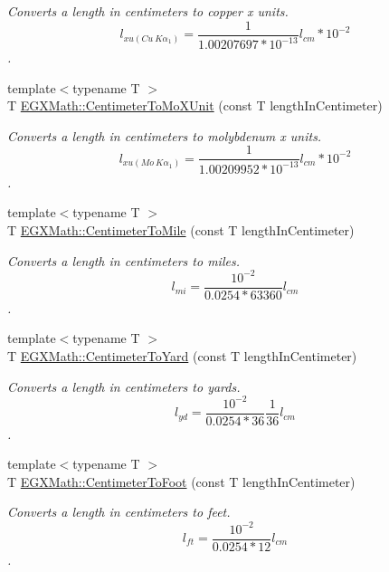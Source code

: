 \begin{DoxyCompactItemize}
\begin{DoxyCompactList}\small\item\em Converts a length in centimeters to copper x units. \[ l_{xu(Cu\ K\alpha_1)}= \frac{1}{1.00207697*10^{-13}} l_{cm} * 10^{-2}\]. \end{DoxyCompactList}\item 
{\footnotesize template$<$typename T $>$ }\\T \mbox{\hyperlink{group___e_g_x_math-_conversions-_length_conversions-_s_i-_centimeter-_non-_s_i_ga4e94aa6f1cc6aaeb751384a8472b01fd}{E\+G\+X\+Math\+::\+Centimeter\+To\+Mo\+X\+Unit}} (const T length\+In\+Centimeter)
\begin{DoxyCompactList}\small\item\em Converts a length in centimeters to molybdenum x units. \[ l_{xu(Mo\ K\alpha_1)}=\frac{1}{1.00209952*10^{-13}} l_{cm} * 10^{-2}\]. \end{DoxyCompactList}\item 
{\footnotesize template$<$typename T $>$ }\\T \mbox{\hyperlink{group___e_g_x_math-_conversions-_length_conversions-_s_i-_centimeter-_imperial_gacba2e8c1f187fae381009e4413d5d4fb}{E\+G\+X\+Math\+::\+Centimeter\+To\+Mile}} (const T length\+In\+Centimeter)
\begin{DoxyCompactList}\small\item\em Converts a length in centimeters to miles. \[ l_{mi}=\frac{10^{-2}}{0.0254 * 63360} l_{cm} \]. \end{DoxyCompactList}\item 
{\footnotesize template$<$typename T $>$ }\\T \mbox{\hyperlink{group___e_g_x_math-_conversions-_length_conversions-_s_i-_centimeter-_imperial_ga9b25beac97b6dfc0700508ca60760dfe}{E\+G\+X\+Math\+::\+Centimeter\+To\+Yard}} (const T length\+In\+Centimeter)
\begin{DoxyCompactList}\small\item\em Converts a length in centimeters to yards. \[ l_{yd}= \frac{10^{-2}}{0.0254 * 36} \frac{1}{36} l_{cm} \]. \end{DoxyCompactList}\item 
{\footnotesize template$<$typename T $>$ }\\T \mbox{\hyperlink{group___e_g_x_math-_conversions-_length_conversions-_s_i-_centimeter-_imperial_ga27bbb3b1cf61bac428f40d6804e9aaec}{E\+G\+X\+Math\+::\+Centimeter\+To\+Foot}} (const T length\+In\+Centimeter)
\begin{DoxyCompactList}\small\item\em Converts a length in centimeters to feet. \[ l_{ft}= \frac{10^{-2}}{0.0254 * 12} l_{cm} \]. \end{DoxyCompactList}\item 

\end{DoxyCompactItemize}
